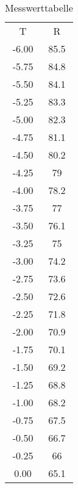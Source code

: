 \begin{table}
  \centering
  \caption{Messwerttabelle}
    \begin{tabular}{cc}
    T     & R \\
    -6.00 & 85.5 \\
    -5.75 & 84.8 \\
    -5.50 & 84.1 \\
    -5.25 & 83.3 \\
    -5.00 & 82.3 \\
    -4.75 & 81.1 \\
    -4.50 & 80.2 \\
    -4.25 & 79 \\
    -4.00 & 78.2 \\
    -3.75 & 77 \\
    -3.50 & 76.1 \\
    -3.25 & 75 \\
    -3.00 & 74.2 \\
    -2.75 & 73.6 \\
    -2.50 & 72.6 \\
    -2.25 & 71.8 \\
    -2.00 & 70.9 \\
    -1.75 & 70.1 \\
    -1.50 & 69.2 \\
    -1.25 & 68.8 \\
    -1.00 & 68.2 \\
    -0.75 & 67.5 \\
    -0.50 & 66.7 \\
    -0.25 & 66 \\
    0.00  & 65.1 \\
    \end{tabular}%
  \label{table:addlabel}%
\end{table}%
